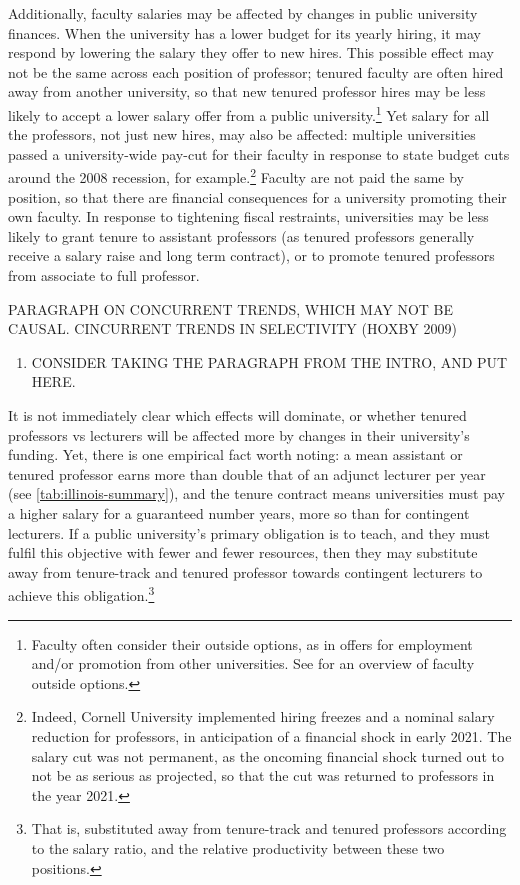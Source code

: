 Additionally, faculty salaries may be affected by changes in public university finances.
When the university has a lower budget for its yearly hiring, it may respond by lowering the salary they offer to new hires.
This possible effect may not be the same across each position of professor; tenured faculty are often hired away from another university, so that new tenured professor hires may be less likely to accept a lower salary offer from a public university.\footnote{
    Faculty often consider their outside options, as in offers for employment and/or promotion from other universities.
    See \cite{blackaby2005} for an overview of faculty outside options.
}
Yet salary for all the professors, not just new hires, may also be affected: multiple universities passed a university-wide pay-cut for their faculty in response to state budget cuts around the 2008 recession, for example.\footnote{
    Indeed, Cornell University implemented hiring freezes and a nominal salary reduction for professors, in anticipation of a financial shock in early 2021.
    The salary cut was not permanent, as the oncoming financial shock turned out to not be as serious as projected, so that the cut was returned to professors in the year 2021.
}
Faculty are not paid the same by position, so that there are financial consequences for a university promoting their own faculty.
In response to tightening fiscal restraints, universities may be less likely to grant tenure to assistant professors (as tenured professors generally receive a salary raise and long term contract), or to promote tenured professors from associate to full professor.

PARAGRAPH ON CONCURRENT TRENDS, WHICH MAY NOT BE CAUSAL.
CINCURRENT TRENDS IN SELECTIVITY (HOXBY 2009)
\begin{enumerate}
    \item CONSIDER TAKING THE PARAGRAPH FROM THE INTRO, AND PUT HERE.
\end{enumerate}

It is not immediately clear which effects will dominate, or whether tenured professors vs lecturers will be affected more by changes in their university's funding.
Yet, there is one empirical fact worth noting: a mean assistant or tenured professor earns more than double that of an adjunct lecturer per year (see \autoref{tab:illinois-summary}), and the tenure contract means universities must pay a higher salary for a guaranteed number years, more so than for contingent lecturers.
If a public university's primary obligation is to teach, and they must fulfil this objective with fewer and fewer resources, then they may substitute away from tenure-track and tenured professor towards contingent lecturers to achieve this obligation.\footnote{
    That is, substituted away from tenure-track and tenured professors according to the salary ratio, and the relative productivity between these two positions.
}
